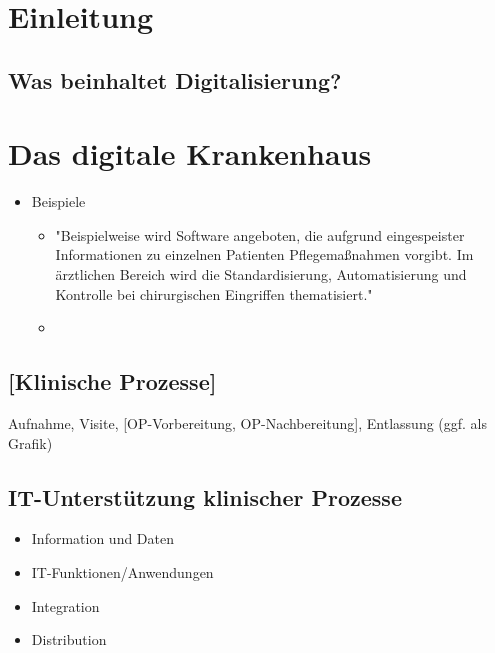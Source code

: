 
{}
\section{Einleitung}
	\subsection{Was beinhaltet Digitalisierung?}
	\parencite[11]{braeutigam2017}
\section{Das digitale Krankenhaus}
	\begin{itemize}
		\item Beispiele
		\begin{itemize}
			\item "Beispielweise wird Software angeboten, die aufgrund eingespeister Informationen zu einzelnen Patienten Pflegemaßnahmen vorgibt. Im ärztlichen Bereich wird die Standardisierung, Automatisierung und Kontrolle bei chirurgischen Eingriffen thematisiert." \parencite[16]{braeutigam2017}
			\item 
		\end{itemize}
	\end{itemize}
	\subsection{[Klinische Prozesse]}
		Aufnahme, Visite, [OP-Vorbereitung, OP-Nachbereitung], Entlassung (ggf. als Grafik)
	\subsection{IT-Unterstützung klinischer Prozesse}
		\parencite[37]{huebner2019}
	\begin{itemize} 
		\item Information und Daten
		\item IT-Funktionen/Anwendungen
		\item Integration
		\item Distribution
	\end{itemize}
